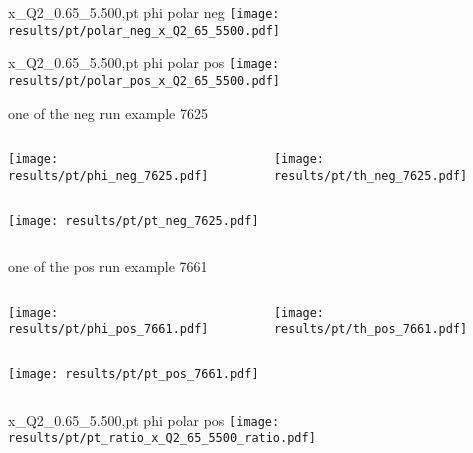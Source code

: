 \begin{frame}{x\_Q2\_0.65\_5.500,pt phi polar neg}
\texttt{[image: results/pt/polar\_neg\_x\_Q2\_65\_5500.pdf]}
\end{frame}
\begin{frame}{x\_Q2\_0.65\_5.500,pt phi polar pos}
\texttt{[image: results/pt/polar\_pos\_x\_Q2\_65\_5500.pdf]}
\end{frame}
\begin{frame}{one of the neg run example 7625}
\begin{columns}
\begin{column}[T]{0.5\textwidth}
\texttt{[image: results/pt/phi\_neg\_7625.pdf]}
\end{column}
\begin{column}[T]{0.5\textwidth}
\texttt{[image: results/pt/th\_neg\_7625.pdf]}
\end{column}
\end{columns}
\begin{columns}
\begin{column}[T]{0.5\textwidth}
\texttt{[image: results/pt/pt\_neg\_7625.pdf]}
\end{column}
\begin{column}[T]{0.5\textwidth}
\end{column}
\end{columns}
\end{frame}
\begin{frame}{one of the pos run example 7661}
\begin{columns}
\begin{column}[T]{0.5\textwidth}
\texttt{[image: results/pt/phi\_pos\_7661.pdf]}
\end{column}
\begin{column}[T]{0.5\textwidth}
\texttt{[image: results/pt/th\_pos\_7661.pdf]}
\end{column}
\end{columns}
\begin{columns}
\begin{column}[T]{0.5\textwidth}
\texttt{[image: results/pt/pt\_pos\_7661.pdf]}
\end{column}
\begin{column}[T]{0.5\textwidth}
\end{column}
\end{columns}
\end{frame}
\begin{frame}{x\_Q2\_0.65\_5.500,pt phi polar pos}
\texttt{[image: results/pt/pt\_ratio\_x\_Q2\_65\_5500\_ratio.pdf]}
\end{frame}
